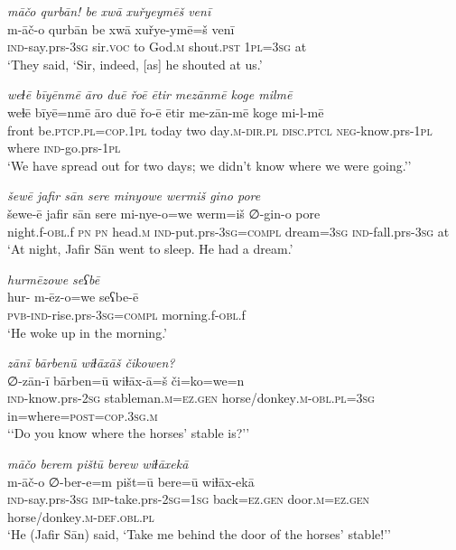 \ea \label{ŠJ.44}
\textit{māčo qurbān! be xwā xuřyeymēš venī} \\ 
\gll m-āč-o qurbān be xwā xuřye-ymē=š venī \\ 
 \textsc{ind-}say.prs\textsc{-3sg} sir.\textsc{voc} to God\textsc{.m} shout\textsc{.pst} \textsc{1pl}\textsc{=3sg} at \\ 
\glt `They said, ‘Sir, indeed, [as] he shouted at us.'
\z 
 
\ea \label{ŠJ.45}
\textit{weɫē bīyēnmē āro duē řoē ētir mezānmē koge milmē} \\ 
\gll weɫē bīyē=nmē āro duē řo-ē ētir me-zān-mē koge mi-l-mē \\ 
 front be\textsc{.ptcp}\textsc{.pl}\textsc{=cop}\textsc{.\textsc{1pl}} today two day\textsc{.m}\textsc{-dir}\textsc{.pl} \textsc{disc.ptcl} \textsc{neg-}know.prs\textsc{-\textsc{1pl}} where \textsc{ind-}go.prs\textsc{-\textsc{1pl}} \\ 
\glt `We have spread out for two days; we didn’t know where we were going.’'
\z 
 
\ea \label{ŠJ.46}
\textit{šewē jafir sān sere minyowe wermiš gino pore} \\ 
\gll šewe-ē jafir sān sere mi-nye-o=we werm=iš ∅-gin-o pore \\ 
 night.f\textsc{-obl}.f \textsc{pn} \textsc{pn} head\textsc{.m} \textsc{ind-}put.prs\textsc{-3sg}\textsc{=compl} dream\textsc{=3sg} \textsc{ind-}fall.prs\textsc{-3sg} at \\ 
\glt `At night, Jafir Sān went to sleep. He had a dream.'
\z 
 
\ea \label{ŠJ.47}
\textit{hurmēzowe seʕbē} \\ 
\gll hur- m-ēz-o=we seʕbe-ē \\ 
 \textsc{pvb-}\textsc{ind-}rise.prs\textsc{-3sg}\textsc{=compl} morning.f\textsc{-obl}.f \\ 
\glt `He woke up in the morning.'
\z 
 
\ea \label{ŠJ.60}
\textit{zānī bārbenū wiɫāxāš čikowen?} \\ 
\gll ∅-zān-ī bārben=ū wiɫāx-ā=š či=ko=we=n \\ 
 \textsc{ind-}know.prs-\textsc{2sg} stableman\textsc{.m}\textsc{=ez.gen} horse/donkey\textsc{.m}\textsc{-obl}\textsc{.pl}\textsc{=3sg} in=where\textsc{=\textsc{post}}\textsc{=cop}\textsc{.3sg}\textsc{.m} \\ 
\glt `‘Do you know where the horses’ stable is?’'
\z 
 
\ea \label{ŠJ.62}
\textit{māčo berem pištū berew wiɫāxekā} \\ 
\gll m-āč-o ∅-ber-e=m pišt=ū bere=ū wiɫāx-ekā \\ 
 \textsc{ind-}say.prs\textsc{-3sg} \textsc{imp-}take.prs-\textsc{2sg}\textsc{=\textsc{1sg}} back\textsc{=ez.gen} door\textsc{.m}\textsc{=ez.gen} horse/donkey\textsc{.m}\textsc{-def}\textsc{.obl}\textsc{.pl} \\ 
\glt `He (Jafir Sān) said, ‘Take me behind the door of the horses’ stable!’'
\z 
 
